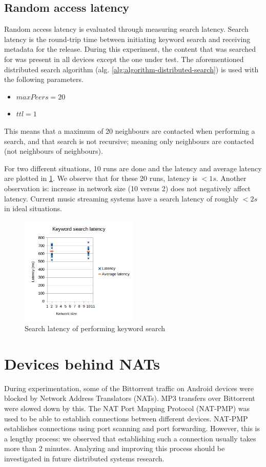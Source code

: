 \subsection{Random access latency}
Random access latency is evaluated through measuring search latency. Search latency is the round-trip time between initiating keyword search and receiving metadata for the release.  During this experiment, the content that was searched for was present in all devices except the one under test. The aforementioned distributed search algorithm (alg. \ref{alg:algorithm-distributed-search}) is used with the following parameters.
\begin{itemize}
    \item $maxPeers=20$
    \item $ttl=1$ 
\end{itemize}
This means that a maximum of 20 neighbours are contacted when performing a search, and that search is not recursive; meaning only neighbours are contacted (not neighbours of neighbours).

For two different situations, 10 runs are done and the latency and average latency are plotted in \ref{fig:search-latency}. We observe that for these 20 runs, latency is $<1s$. Another observation is: increase in network size (10 versus 2) does not negatively affect latency. Current music streaming systems have a search latency of roughly $<2s$ in ideal situations.

\begin{figure}
    \centering
    \includegraphics[width=0.5\textwidth]{evaluation/search-latency.png}
    \caption{Search latency of performing keyword search}
    \label{fig:search-latency}
\end{figure}

\section{Devices behind NATs}
During experimentation, some of the Bittorrent traffic on Android devices were blocked by Network Address  Translators (NATs). MP3 transfers over Bittorrent were slowed down by this. The NAT Port Mapping Protocol (NAT-PMP) was used to be able to establish connections between different devices. NAT-PMP establishes connections using port scanning and port forwarding. However, this is a lengthy process: we observed that establishing such a connection usually takes more than 2 minutes. Analyzing and improving this process should be investigated in future distributed systems research.

